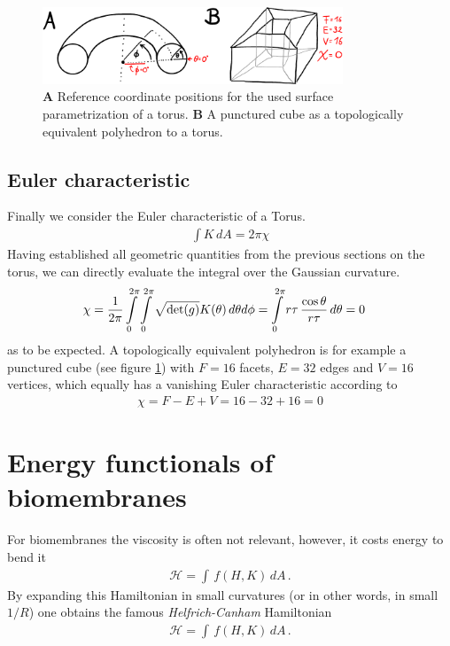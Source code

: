 \documentclass[11pt, DINA4, fleqn]{amsart}
\begin{document}
\begin{figure}[h]
	\centering
	\includegraphics[width=0.80\textwidth]{./figures/torus_f2}
	\caption{\textbf{A} Reference coordinate positions for the used surface parametrization of a torus. \textbf{B} A punctured cube as a topologically equivalent polyhedron to a torus.}
	\label{fig:torus_f2}
\end{figure}

\subsection{Euler characteristic}
Finally we consider the Euler characteristic of a Torus.
\begin{align}
\int K \, dA = 2\pi \chi
\end{align}
Having established all geometric quantities from the previous sections on the torus, we can directly evaluate the integral over the Gaussian curvature.
\begin{align}
\chi &= \dfrac{1}{2\pi} \int \displaylimits_{0}^{2\pi} \int \displaylimits_{0}^{2\pi}
\sqrt{\text{det}(g)} K(\theta) \, d\theta d\phi
= \int \displaylimits_{0}^{2\pi} r \tau \, \dfrac{\cos\theta}{r \tau} \, d\theta = 0
\end{align}
as to be expected.
A topologically equivalent polyhedron is for example a punctured cube (see figure \ref{fig:torus_f2}) with $F= 16$ facets, $E = 32$ edges and
$V = 16$ vertices, which equally has a vanishing Euler characteristic according to
\begin{align}
\chi = F - E + V = 16 - 32 + 16 = 0
\end{align}

\section{Energy functionals of biomembranes}
For biomembranes the viscosity is often not relevant, however, it costs energy to bend it
\begin{align}
\mathcal{H} = \int \, f(H,K) \, dA \, .
\end{align}
By expanding this Hamiltonian in small curvatures (or in other words, in small $1/R$) one obtains the famous \emph{Helfrich-Canham} Hamiltonian
\begin{align}
\mathcal{H} = \int \, f(H,K) \, dA \, .
\end{align}
\end{document}
